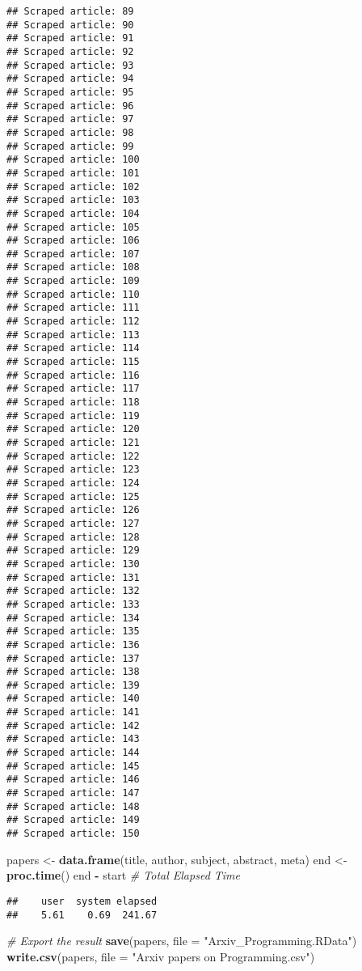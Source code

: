 \documentclass[
]{article}
\newenvironment{Shaded}{\begin{snugshade}}{\end{snugshade}}
\newcommand{\AttributeTok}[1]{\textcolor[rgb]{0.13,0.29,0.53}{#1}}
\newcommand{\CommentTok}[1]{\textcolor[rgb]{0.56,0.35,0.01}{\textit{#1}}}
\newcommand{\FunctionTok}[1]{\textcolor[rgb]{0.13,0.29,0.53}{\textbf{#1}}}
\newcommand{\NormalTok}[1]{#1}
\newcommand{\OtherTok}[1]{\textcolor[rgb]{0.56,0.35,0.01}{#1}}
\newcommand{\SpecialCharTok}[1]{\textcolor[rgb]{0.81,0.36,0.00}{\textbf{#1}}}
\newcommand{\StringTok}[1]{\textcolor[rgb]{0.31,0.60,0.02}{#1}}
\begin{document}
\begin{verbatim}
## Scraped article: 89 
## Scraped article: 90 
## Scraped article: 91 
## Scraped article: 92 
## Scraped article: 93 
## Scraped article: 94 
## Scraped article: 95 
## Scraped article: 96 
## Scraped article: 97 
## Scraped article: 98 
## Scraped article: 99 
## Scraped article: 100 
## Scraped article: 101 
## Scraped article: 102 
## Scraped article: 103 
## Scraped article: 104 
## Scraped article: 105 
## Scraped article: 106 
## Scraped article: 107 
## Scraped article: 108 
## Scraped article: 109 
## Scraped article: 110 
## Scraped article: 111 
## Scraped article: 112 
## Scraped article: 113 
## Scraped article: 114 
## Scraped article: 115 
## Scraped article: 116 
## Scraped article: 117 
## Scraped article: 118 
## Scraped article: 119 
## Scraped article: 120 
## Scraped article: 121 
## Scraped article: 122 
## Scraped article: 123 
## Scraped article: 124 
## Scraped article: 125 
## Scraped article: 126 
## Scraped article: 127 
## Scraped article: 128 
## Scraped article: 129 
## Scraped article: 130 
## Scraped article: 131 
## Scraped article: 132 
## Scraped article: 133 
## Scraped article: 134 
## Scraped article: 135 
## Scraped article: 136 
## Scraped article: 137 
## Scraped article: 138 
## Scraped article: 139 
## Scraped article: 140 
## Scraped article: 141 
## Scraped article: 142 
## Scraped article: 143 
## Scraped article: 144 
## Scraped article: 145 
## Scraped article: 146 
## Scraped article: 147 
## Scraped article: 148 
## Scraped article: 149 
## Scraped article: 150
\end{verbatim}

\begin{Shaded}
\begin{Highlighting}[]
\NormalTok{papers }\OtherTok{\textless{}{-}} \FunctionTok{data.frame}\NormalTok{(title, author, subject, abstract, meta)}
\NormalTok{end }\OtherTok{\textless{}{-}} \FunctionTok{proc.time}\NormalTok{()}
\NormalTok{end }\SpecialCharTok{{-}}\NormalTok{ start }\CommentTok{\# Total Elapsed Time}
\end{Highlighting}
\end{Shaded}

\begin{verbatim}
##    user  system elapsed 
##    5.61    0.69  241.67
\end{verbatim}

\begin{Shaded}
\begin{Highlighting}[]
\CommentTok{\# Export the result}
\FunctionTok{save}\NormalTok{(papers, }\AttributeTok{file =} \StringTok{"Arxiv\_Programming.RData"}\NormalTok{)}
\FunctionTok{write.csv}\NormalTok{(papers, }\AttributeTok{file =} \StringTok{"Arxiv papers on Programming.csv"}\NormalTok{)}
\end{Highlighting}
\end{Shaded}
\end{document}
